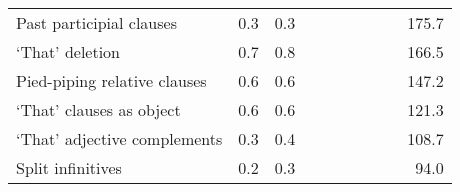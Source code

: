 \begin{table}[!t]
\begin{tabular*}{\linewidth}{@{\extracolsep{\fill}}lrrrrrrrrr}
Past participial clauses & 0.3 & 0.3 & {\cellcolor[HTML]{4393C3}{\textcolor[HTML]{FFFFFF}{273\%}}} & {\cellcolor[HTML]{4393C3}{\textcolor[HTML]{FFFFFF}{307\%}}} & {\cellcolor[HTML]{92C5DE}{\textcolor[HTML]{000000}{158\%}}} & {\cellcolor[HTML]{92C5DE}{\textcolor[HTML]{000000}{150\%}}} & {\cellcolor[HTML]{F4A582}{\textcolor[HTML]{000000}{59\%}}} & {\cellcolor[HTML]{F4A582}{\textcolor[HTML]{000000}{71\%}}} & 175.7 \\ 
‘That’ deletion & 0.7 & 0.8 & {\cellcolor[HTML]{FDDBC7}{\textcolor[HTML]{000000}{75\%}}} & {\cellcolor[HTML]{F4A582}{\textcolor[HTML]{000000}{66\%}}} & {\cellcolor[HTML]{F4A582}{\textcolor[HTML]{000000}{75\%}}} & {\cellcolor[HTML]{F4A582}{\textcolor[HTML]{000000}{73\%}}} & {\cellcolor[HTML]{92C5DE}{\textcolor[HTML]{000000}{134\%}}} & {\cellcolor[HTML]{92C5DE}{\textcolor[HTML]{000000}{151\%}}} & 166.5 \\ 
Pied-piping relative clauses & 0.6 & 0.6 & {\cellcolor[HTML]{F4A582}{\textcolor[HTML]{000000}{59\%}}} & {\cellcolor[HTML]{F4A582}{\textcolor[HTML]{000000}{56\%}}} & {\cellcolor[HTML]{D6604D}{\textcolor[HTML]{FFFFFF}{38\%}}} & {\cellcolor[HTML]{D6604D}{\textcolor[HTML]{FFFFFF}{43\%}}} & {\cellcolor[HTML]{D6604D}{\textcolor[HTML]{FFFFFF}{50\%}}} & {\cellcolor[HTML]{F4A582}{\textcolor[HTML]{000000}{54\%}}} & 147.2 \\ 
‘That’ clauses as object & 0.6 & 0.6 & {\cellcolor[HTML]{F4A582}{\textcolor[HTML]{000000}{65\%}}} & {\cellcolor[HTML]{F4A582}{\textcolor[HTML]{000000}{56\%}}} & {\cellcolor[HTML]{F4A582}{\textcolor[HTML]{000000}{66\%}}} & {\cellcolor[HTML]{F4A582}{\textcolor[HTML]{000000}{60\%}}} & {\cellcolor[HTML]{F7F7F7}{\textcolor[HTML]{000000}{93\%}}} & {\cellcolor[HTML]{FDDBC7}{\textcolor[HTML]{000000}{90\%}}} & 121.3 \\ 
‘That’ adjective complements & 0.3 & 0.4 & {\cellcolor[HTML]{FDDBC7}{\textcolor[HTML]{000000}{80\%}}} & {\cellcolor[HTML]{F4A582}{\textcolor[HTML]{000000}{51\%}}} & {\cellcolor[HTML]{D1E5F0}{\textcolor[HTML]{000000}{121\%}}} & {\cellcolor[HTML]{F7F7F7}{\textcolor[HTML]{000000}{106\%}}} & {\cellcolor[HTML]{92C5DE}{\textcolor[HTML]{000000}{148\%}}} & {\cellcolor[HTML]{92C5DE}{\textcolor[HTML]{000000}{139\%}}} & 108.7 \\ 
Split infinitives & 0.2 & 0.3 & {\cellcolor[HTML]{FDDBC7}{\textcolor[HTML]{000000}{79\%}}} & {\cellcolor[HTML]{F7F7F7}{\textcolor[HTML]{000000}{94\%}}} & {\cellcolor[HTML]{F7F7F7}{\textcolor[HTML]{000000}{110\%}}} & {\cellcolor[HTML]{F7F7F7}{\textcolor[HTML]{000000}{104\%}}} & {\cellcolor[HTML]{D6604D}{\textcolor[HTML]{FFFFFF}{44\%}}} & {\cellcolor[HTML]{D6604D}{\textcolor[HTML]{FFFFFF}{49\%}}} & 94.0 \\ 

\end{tabular*}
\end{table}
